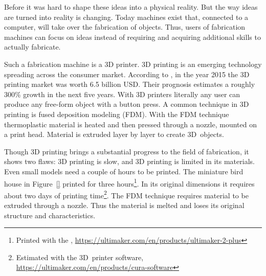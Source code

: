 \documentclass[../ClassicThesis.tex]{subfiles}
\begin{document}
Before it was hard to shape these ideas into a physical reality. But
the way ideas are turned into reality is changing. Today machines
exist that, connected to a computer, will take over the fabrication of
objects. Thus, users of fabrication machines can focus on ideas
instead of requiring and acquiring additional skills to actually
fabricate.


Such a fabrication machine is a 3D printer. 3D printing is an emerging
technology spreading across the consumer market. According to
, in the year 2015 the 3D printing market was
worth 6.5 billion USD. Their prognosis estimates a roughly 300\%
growth in the next five years\cite{wohlers-market}. With 3D printers
literally any user can produce any free-form object with a button
press. A common technique in 3D printing is fused deposition modeling
(FDM)\cite{}. With the FDM technique
thermoplastic material is heated and then pressed through a nozzle,
mounted on a print head. Material is extruded layer by layer  to
create 3D~objects\cite{}.

Though 3D printing brings a substantial progress to the field of
fabrication, it shows two flaws: 3D printing is slow, and 3D printing
is limited in its materials. Even small models need a couple of hours
to be printed. The miniature bird house in Figure~\ref{}
printed for three hours\footnote{Printed with the ,
  \url{https://ultimaker.com/en/products/ultimaker-2-plus}}. In its
original dimensions it requires about two days of printing
time\footnote{Estimated with the  3D~printer software,
  \url{https://ultimaker.com/en/products/cura-software}}. The FDM
technique requires material to be extruded through a nozzle. Thus the
material is melted and loses its original structure and
characteristics.


\end{document}
